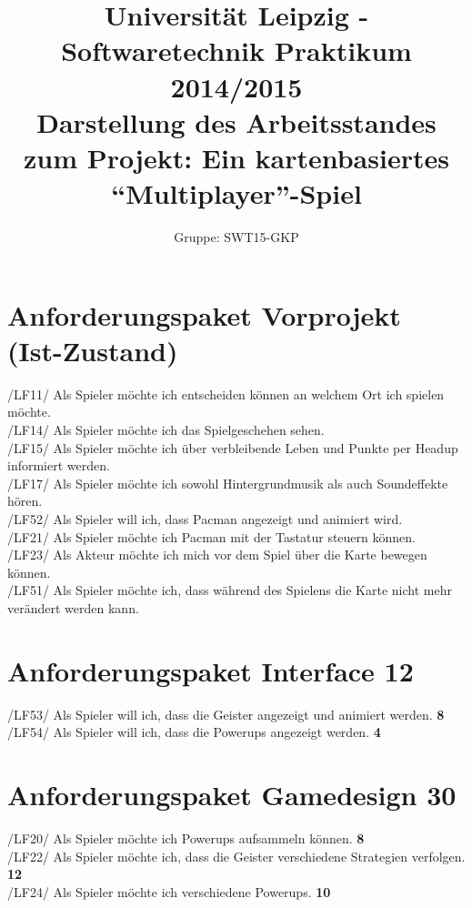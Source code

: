 \documentclass[11pt,a4paper]{article}
\author{Gruppe: SWT15-GKP}
\title{Universität Leipzig - Softwaretechnik Praktikum 2014/2015 \\  Darstellung des Arbeitsstandes \\ zum Projekt: Ein kartenbasiertes “Multiplayer”-Spiel}
\begin{document}
\maketitle

\clearpage

\flushleft


\section{Anforderungspaket Vorprojekt (Ist-Zustand)}
 /LF11/ Als Spieler möchte ich entscheiden können an welchem Ort ich \noindent\hspace*{13mm} spielen möchte.\\
 /LF14/ Als Spieler möchte ich das Spielgeschehen sehen.\\
 /LF15/ Als Spieler möchte ich über verbleibende Leben und Punkte per \noindent\hspace*{13mm} Headup informiert werden.\\
 /LF17/ Als Spieler möchte ich sowohl Hintergrundmusik als auch \noindent\hspace*{13mm} Soundeffekte hören.\\
 /LF52/ Als Spieler will ich, dass Pacman angezeigt und animiert wird.\\
 /LF21/ Als Spieler möchte ich Pacman mit der Tastatur steuern können.\\
 /LF23/ Als Akteur möchte ich mich vor dem Spiel über die Karte bewegen \noindent\hspace*{13mm} können.\\
 /LF51/ Als Spieler möchte ich, dass während des Spielens die Karte nicht \noindent\hspace*{13mm} mehr verändert werden kann.


\section{Anforderungspaket Interface 12}
/LF53/ Als Spieler will ich, dass die Geister angezeigt und animiert \noindent\hspace*{13mm} werden. \textbf{8}\\
/LF54/ Als Spieler will ich, dass die Powerups angezeigt werden. \textbf{4}
\section{Anforderungspaket Gamedesign 30}
/LF20/ Als Spieler möchte ich Powerups aufsammeln können. \textbf{8}\\
/LF22/ Als Spieler möchte ich, dass die Geister verschiedene Strategien \noindent\hspace*{13mm} verfolgen. \textbf{12}\\
/LF24/ Als Spieler möchte ich verschiedene Powerups. \textbf{10}\\
\end{document}
